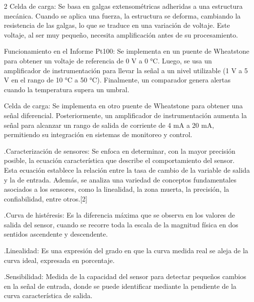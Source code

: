 \documentclass{article}
\begin{document}
\begin{multicols}{2}
Celda de carga: Se basa en galgas extensométricas adheridas a una estructura mecánica. Cuando se aplica una fuerza, la estructura se deforma, cambiando la resistencia de las galgas, lo que se traduce en una variación de voltaje. Este voltaje, al ser muy pequeño, necesita amplificación antes de su procesamiento.

\vspace{0.2cm}

Funcionamiento en el Informe
Pt100: Se implementa en un puente de Wheatstone para obtener un voltaje de referencia de 0 V a 0 °C. Luego, se usa un amplificador de instrumentación para llevar la señal a un nivel utilizable (1 V a 5 V en el rango de 10 °C a 50 °C). Finalmente, un comparador genera alertas cuando la temperatura supera un umbral.

\vspace{0.2cm}

Celda de carga: Se implementa en otro puente de Wheatstone para obtener una señal diferencial. Posteriormente, un amplificador de instrumentación aumenta la señal para alcanzar un rango de salida de corriente de 4 mA a 20 mA, permitiendo su integración en sistemas de monitoreo y control.

\vspace{0.2cm}

.Caracterización de sensores: Se enfoca en determinar, con la mayor precisión posible, la ecuación característica que describe el comportamiento del sensor. Esta ecuación establece la relación entre la tasa de cambio de la variable de salida y la de entrada. Además, se analiza una variedad de conceptos fundamentales asociados a los sensores, como la linealidad, la zona muerta, la precisión, la confiabilidad, entre otros.[2]

\vspace{0.2cm}

.Curva de histéresis: Es la diferencia máxima que se observa en los valores de salida del sensor, cuando se recorre toda la escala de la magnitud física en dos sentidos ascendente y descendente.

\vspace{0.2cm}

.Linealidad: Es una expresión del grado en que la curva medida real se aleja de la curva ideal, expresada en porcentaje. 

\vspace{0.2cm}

.Sensibilidad: Medida de la capacidad del sensor para detectar pequeños cambios en la señal de entrada, donde se puede identificar mediante la pendiente de la curva característica de salida.


\end{multicols}
\end{document}

